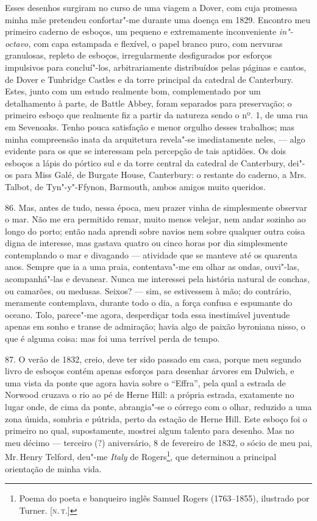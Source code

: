 Esses desenhos surgiram no curso de uma viagem a Dover, com cuja
promessa minha mãe pretendeu confortar"-me durante uma doença em 1829.
Encontro meu primeiro caderno de esboços, um pequeno e extremamente
inconveniente \emph{in"-octavo,} com capa estampada e flexível, o papel
branco puro, com nervuras granulosas, repleto de esboços, irregularmente
desfigurados por esforços impulsivos para concluí"-los, arbitrariamente
distribuídos pelas páginas e cantos, de Dover e Tunbridge Castles e da
torre principal da catedral de Canterbury. Estes, junto com um estudo
realmente bom, complementado por um detalhamento à parte, de Battle
Abbey, foram separados para preservação; o primeiro esboço que realmente
fiz a partir da natureza sendo o nº. 1, de uma rua em Sevenoaks. Tenho
pouca satisfação e menor orgulho desses trabalhos; mas minha compreensão
inata da arquitetura revela"-se imediatamente neles, --- algo evidente
para os que se interessam pela percepção de tais aptidões. Os dois
esboços a lápis do pórtico sul e da torre central da catedral de
Canterbury, dei"-os para Miss Galé, de Burgate House, Canterbury: o
restante do caderno, a Mrs.\,Talbot, de Tyn"-y"-Ffynon, Barmouth, ambos
amigos muito queridos.

86. Mas, antes de tudo, nessa época, meu prazer vinha de simplesmente
observar o mar. Não me era permitido remar, muito menos velejar, nem
andar sozinho ao longo do porto; então nada aprendi sobre navios nem
sobre qualquer outra coisa digna de interesse, mas gastava quatro ou
cinco horas por dia simplesmente contemplando o mar e divagando ---
atividade que se manteve até os quarenta anos. Sempre que ia a uma
praia, contentava"-me em olhar as ondas, ouvi"-las, acompanhá"-las e
devanear. Nunca me interessei pela história natural de conchas, ou
camarões, ou medusas. Seixos? --- sim, se estivessem à mão; do contrário,
meramente contemplava, durante todo o dia, a força confusa e espumante
do oceano. Tolo, parece"-me agora, desperdiçar toda essa inestimável
juventude apenas em sonho e transe de admiração; havia algo de paixão
byroniana nisso, o que é alguma coisa: mas foi uma terrível perda de
tempo.

87. O verão de 1832, creio, deve ter sido passado em casa, porque meu
segundo livro de esboços contém apenas esforços para desenhar árvores em
Dulwich, e uma vista da ponte que agora havia sobre o ``Effra'', pela
qual a estrada de Norwood cruzava o rio ao pé de Herne Hill: a própria
estrada, exatamente no lugar onde, de cima da ponte, abrangia"-se o
córrego com o olhar, reduzido a uma zona úmida, sombria e pútrida, perto
da estação de Herne Hill. Este esboço foi o primeiro no qual,
supostamente, mostrei algum talento para desenho. Mas no meu décimo ---
terceiro (?) aniversário, 8 de fevereiro de 1832, o sócio de meu pai, Mr.\,Henry Telford, deu"-me \emph{Italy} de Rogers\footnote{Poema do poeta e
  banqueiro inglês Samuel Rogers (1763--1855), ilustrado por Turner. {[}\textsc{n.\,t.}{]}}, que determinou a principal orientação de minha vida.

